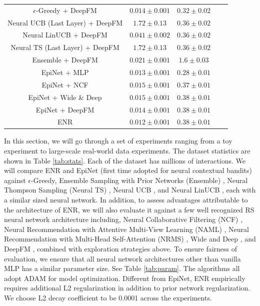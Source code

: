 \begin{table}[t!]
\begin{tabular}{ccccc}
    \midrule
    $\epsilon$-Greedy + DeepFM & $0.014 \pm 0.001$ & $0.32 \pm 0.02$\\
    Neural UCB (Last Layer) + DeepFM & $1.72 \pm 0.13$ & $0.36 \pm 0.02$\\
    Neural LinUCB + DeepFM & $0.041 \pm 0.002$ & $0.36 \pm 0.02$\\
    Neural TS (Last Layer) + DeepFM & $1.72 \pm 0.13$ & $0.36 \pm 0.02$\\
    Ensemble + DeepFM & $0.021 \pm 0.001$ & $1.6 \pm 0.03$\\
    \midrule\midrule
    EpiNet + MLP & $0.013 \pm 0.001$ & $0.28 \pm 0.01$\\
    EpiNet + NCF & $0.015 \pm 0.001$ & $0.37 \pm 0.01$\\
    EpiNet + Wide \& Deep & $0.015 \pm 0.001$ & $0.38 \pm 0.01$\\
    EpiNet + DeepFM & $0.014 \pm 0.001$ & $0.38 \pm 0.01$\\
    \midrule
    ENR & $0.012 \pm 0.001$ & $0.38 \pm 0.01$\\
  \bottomrule
\end{tabular}
\vspace{-0.1in}
\end{table}

In this section, we will go through a set of experiments ranging from a toy experiment to large-scale real-world data experiments. The dataset statistics are shown in Table \ref{tab:stats}. Each of the dataset has millions of interactions. We will compare ENR and EpiNet \cite{osband2021epistemic} (first time adopted for neural contextual bandits) against $\epsilon$-Greedy, Ensemble Sampling with Prior Networks (Ensemble) \cite{lu2017ensemble}, Neural Thompson Sampling (Neural TS) \cite{zhang2021neural}, Neural UCB \cite{zhou2020neural}, and Neural LinUCB \cite{xu2021neural}, each with a similar sized neural network. In addition, to assess advantages attributable to the architecture of ENR, we will also evaluate it against a few well recognized RS neural network architecture including, Neural Collaborative Filtering (NCF) \cite{he2017neural}, Neural Recommendation with Attentive Multi-View Learning (NAML) \cite{wu2019naml}, Neural Recommendation with Multi-Head Self-Attention (NRMS) \cite{wu2019neural}, Wide and Deep \cite{cheng2016wide}, and DeepFM \cite{guo2017deepfm}, combined with exploration strategies above. To ensure fairness of evaluation, we ensure that all neural network architectures other than vanilla MLP has a similar parameter size. See Table \ref{tab:param}. The algorithms all adopt ADAM \cite{kingma2015adam} for model optimization. Different from EpiNet, ENR empirically requires additional L2 regularization in addition to prior network regularization. We choose L2 decay coefficient to be 0.0001 across the experiments. 


